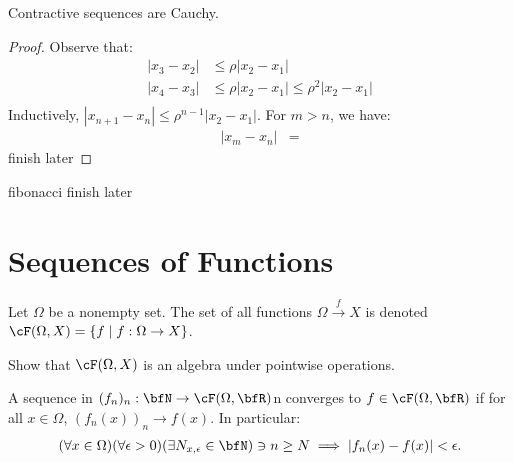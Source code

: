     \begin{proposition}
        Contractive sequences are Cauchy.
    \end{proposition}
        \begin{proof}
            Observe that:
                \begin{equation*}
                \begin{split}
                    |x_3 - x_2| &\leq \rho |x_2 - x_1| \\
                    |x_4 - x_3| &\leq \rho |x_2 - x_1|  \leq \rho^2 |x_2 - x_1|\\
                \end{split}
                \end{equation*}
            Inductively, $|x_{n+1} - x_n| \leq \rho^{n-1}|x_2 - x_1|$. For $m > n$, we have:
                \begin{equation*}
                \begin{split}
                    |x_m - x_n|
                    & = 
                \end{split}
                \end{equation*}
                {\color{red} finish later}
        \end{proof}

    \begin{example}
        {\color{red} fibonacci finish later}
    \end{example}

\section{Sequences of Functions}
    \begin{definition}
        Let $\Omega$ be a nonempty set. The set of all functions $\Omega\xrightarrow{f} X$ is denoted $\cF(\Omega,X) = \{f \mid f:\Omega \rightarrow X\}$.
    \end{definition}

    \begin{exercise}
        Show that $\cF(\Omega,X)$ is an algebra under pointwise operations.
    \end{exercise}

    \begin{definition}
        A sequence in $(f_n)_n : \bfN \rightarrow \cF(\Omega,\bfR)$n converges  to $f \in \cF(\Omega,\bfR)$ if for all $x \in \Omega$, $(f_n(x))_n \rightarrow f(x)$. In particular:
            \begin{equation*}
            \begin{split}
                (\forall x \in \Omega)(\forall \epsilon > 0)(\exists N_{x,\epsilon} \in \bfN) \ni n \geq N \implies |f_n(x) - f(x)| < \epsilon.
            \end{split}
            \end{equation*}
    \end{definition}

